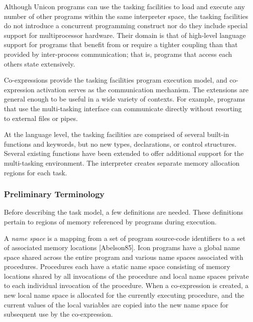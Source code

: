 Although Unicon programs can use the tasking facilities to load and
execute any number of other programs within the same interpreter space,
the tasking facilities do not introduce a concurrent programming
construct nor do they include special support for multiprocessor
hardware. Their domain is that of high-level language support for
programs that benefit from or require a tighter coupling than that
provided by inter-process communication; that is, programs that access
each other{\textquotesingle}s state extensively.

Co-expressions provide the tasking facilities{\textquotesingle} program
execution model, and co-expression activation serves as the
communication mechanism. The extensions are general enough to be useful
in a wide variety of contexts. For example, programs that use the
multi-tasking interface can communicate directly without resorting to
external files or pipes.

At the language level, the tasking facilities are comprised of several
built-in functions and keywords, but no new types, declarations, or
control structures. Several existing functions have been extended to
offer additional support for the multi-tasking environment. The
interpreter creates separate memory allocation regions for each task. 

\subsubsection[Preliminary Terminology]{Preliminary Terminology}

Before describing the task model, a few definitions are needed. These
definitions pertain to regions of memory referenced by programs during
execution. 

A \textit{name space} is a mapping from a set of program source-code
identifiers to a set of associated memory locations [Abelson85]. Icon
programs have a global name space shared across the entire program and
various name spaces associated with procedures. Procedures each have a
static name space consisting of memory locations shared by all
invocations of the procedure and local name spaces private to each
individual invocation of the procedure.\newline
\newline
When a co-expression is created, a new local name space is allocated for
the currently executing procedure, and the current values of the local
variables are copied into the new name space for subsequent use by the
co-expression. 

